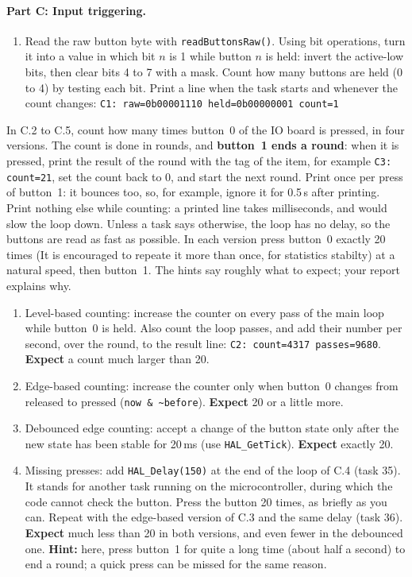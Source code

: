 \documentclass[11pt,a4paper]{article}
\begin{document}
\paragraph{Part C: Input triggering.}
\begin{enumerate}[label=C.\arabic*, leftmargin=2.2em]
  \item Read the raw button byte with \texttt{readButtonsRaw()}. Using bit operations, turn it into a value in which
        bit $n$ is 1 while button $n$ is held: invert the active-low bits, then clear bits 4 to 7 with a mask. Count
        how many buttons are held (0 to 4) by testing each bit. Print a line when the task starts and whenever the
        count changes:
        \texttt{C1: raw=0b00001110 held=0b00000001 count=1}
\end{enumerate}
In C.2 to C.5, count how many times button~0 of the IO board is pressed, in four versions. The count is done in
rounds, and \textbf{button~1 ends a round}: when it is pressed, print the result of the round with the tag of the item,
for example \texttt{C3: count=21}, set the count back to 0, and start the next round. Print once per press of
button~1: it bounces too, so, for example, ignore it for 0.5\,s after printing. Print nothing else while counting: a
printed line takes milliseconds, and would slow the loop down. Unless a task says otherwise, the loop has no delay, so
the buttons are read as fast as possible. In each version press button~0 exactly 20 times (It is encouraged to repeate it more than once, for statistics stabilty) at a natural
speed, then button~1. The hints say roughly what to expect; your report explains why.
\begin{enumerate}[label=C.\arabic*, leftmargin=2.2em, start=2]
  \item Level-based counting: increase the counter on every pass of the main loop while button~0 is held. Also count
        the loop passes, and add their number per second, over the round, to the result line:
        \texttt{C2: count=4317 passes=9680}. \textbf{Expect} a count much larger than 20.
  \item Edge-based counting: increase the counter only when button~0 changes from released to pressed
        (\texttt{now \& \textasciitilde before}). \textbf{Expect} 20 or a little more.
  \item Debounced edge counting: accept a change of the button state only after the new state has been stable for
        20\,ms (use \texttt{HAL\_GetTick}). \textbf{Expect} exactly 20.
  \item Missing presses: add \texttt{HAL\_Delay(150)} at the end of the loop of C.4 (task 35). It stands for another
        task running on the microcontroller, during which the code cannot check the button. Press the button 20 times,
        as briefly as you can. Repeat with the edge-based version of C.3 and the same delay (task 36).
        \textbf{Expect} much less than 20 in both versions, and even fewer in the debounced one.
        \textbf{Hint:} here, press button~1 for quite a long time (about half a second) to end a round; a quick press
        can be missed for the same reason.
\end{enumerate}
\end{document}
